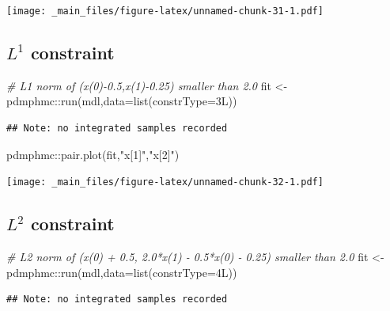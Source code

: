\documentclass[
]{book}
\newenvironment{Shaded}{\begin{snugshade}}{\end{snugshade}}
\newcommand{\AttributeTok}[1]{\textcolor[rgb]{0.77,0.63,0.00}{#1}}
\newcommand{\CommentTok}[1]{\textcolor[rgb]{0.56,0.35,0.01}{\textit{#1}}}
\newcommand{\FunctionTok}[1]{\textcolor[rgb]{0.00,0.00,0.00}{#1}}
\newcommand{\NormalTok}[1]{#1}
\newcommand{\OtherTok}[1]{\textcolor[rgb]{0.56,0.35,0.01}{#1}}
\newcommand{\SpecialCharTok}[1]{\textcolor[rgb]{0.00,0.00,0.00}{#1}}
\newcommand{\StringTok}[1]{\textcolor[rgb]{0.31,0.60,0.02}{#1}}
\begin{document}
\texttt{[image: \_main\_files/figure-latex/unnamed-chunk-31-1.pdf]}

\hypertarget{l1-constraint}{%
\subsection{\texorpdfstring{\(L^1\) constraint}{L\^{}1 constraint}}\label{l1-constraint}}

\begin{Shaded}
\begin{Highlighting}[]
\CommentTok{\# L1 norm of (x(0){-}0.5,x(1){-}0.25) smaller than 2.0}
\NormalTok{fit }\OtherTok{\textless{}{-}}\NormalTok{ pdmphmc}\SpecialCharTok{::}\FunctionTok{run}\NormalTok{(mdl,}\AttributeTok{data=}\FunctionTok{list}\NormalTok{(}\AttributeTok{constrType=}\NormalTok{3L))}
\end{Highlighting}
\end{Shaded}

\begin{verbatim}
## Note: no integrated samples recorded
\end{verbatim}

\begin{Shaded}
\begin{Highlighting}[]
\NormalTok{pdmphmc}\SpecialCharTok{::}\FunctionTok{pair.plot}\NormalTok{(fit,}\StringTok{"x[1]"}\NormalTok{,}\StringTok{"x[2]"}\NormalTok{)}
\end{Highlighting}
\end{Shaded}

\texttt{[image: \_main\_files/figure-latex/unnamed-chunk-32-1.pdf]}

\hypertarget{l2-constraint}{%
\subsection{\texorpdfstring{\(L^2\) constraint}{L\^{}2 constraint}}\label{l2-constraint}}

\begin{Shaded}
\begin{Highlighting}[]
\CommentTok{\# L2 norm of (x(0) + 0.5, 2.0*x(1) {-} 0.5*x(0) {-} 0.25) smaller than 2.0}
\NormalTok{fit }\OtherTok{\textless{}{-}}\NormalTok{ pdmphmc}\SpecialCharTok{::}\FunctionTok{run}\NormalTok{(mdl,}\AttributeTok{data=}\FunctionTok{list}\NormalTok{(}\AttributeTok{constrType=}\NormalTok{4L))}
\end{Highlighting}
\end{Shaded}

\begin{verbatim}
## Note: no integrated samples recorded
\end{verbatim}
\end{document}

